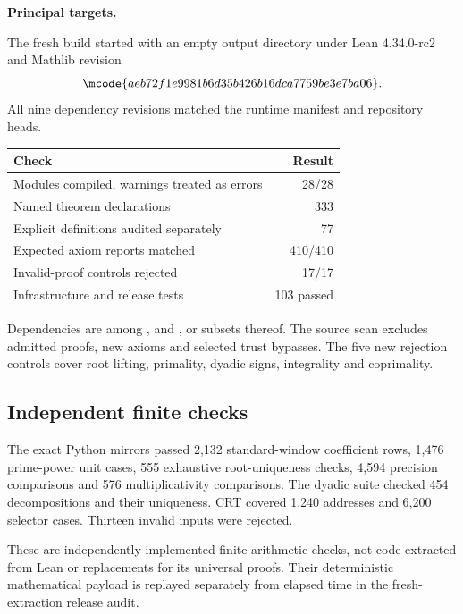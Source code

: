 \textbf{Principal targets.}\par
{}\par
{}\par
{}
\par\medskip
{}
The fresh build started with an empty output directory under Lean 4.34.0-rc2 and Mathlib revision
\[
 \mcode{aeb72f1e9981b6d35b426b16dca7759be3e7ba06}.
\]
All nine dependency revisions matched the runtime manifest and repository heads.

\begin{center}
\begin{tabular}{@{}p{}r@{}}
\toprule
Check & Result\\\midrule
Modules compiled, warnings treated as errors & 28/28\\
Named theorem declarations & 333\\
Explicit definitions audited separately & 77\\
Expected axiom reports matched & 410/410\\
Invalid-proof controls rejected & 17/17\\
Infrastructure and release tests & 103 passed\\\bottomrule
\end{tabular}
\end{center}
Dependencies are among ,  and , or subsets thereof. The source scan excludes admitted proofs, new axioms and selected trust bypasses. The five new rejection controls cover root lifting, primality, dyadic signs, integrality and coprimality.

\subsection*{Independent finite checks}
The exact Python mirrors passed 2,132 standard-window coefficient rows, 1,476 prime-power unit cases, 555 exhaustive root-uniqueness checks, 4,594 precision comparisons and 576 multiplicativity comparisons. The dyadic suite checked 454 decompositions and their uniqueness. CRT covered 1,240 addresses and 6,200 selector cases. Thirteen invalid inputs were rejected.

These are independently implemented finite arithmetic checks, not code extracted from Lean or replacements for its universal proofs. Their deterministic mathematical payload is replayed separately from elapsed time in the fresh-extraction release audit.

